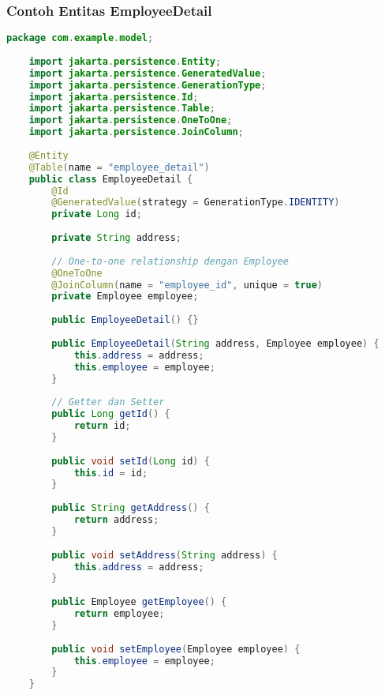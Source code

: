\subsubsection*{Contoh Entitas EmployeeDetail}
\begin{lstlisting}[language=Java, style=JavaStyle]
	package com.example.model;
	
	import jakarta.persistence.Entity;
	import jakarta.persistence.GeneratedValue;
	import jakarta.persistence.GenerationType;
	import jakarta.persistence.Id;
	import jakarta.persistence.Table;
	import jakarta.persistence.OneToOne;
	import jakarta.persistence.JoinColumn;
	
	@Entity
	@Table(name = "employee_detail")
	public class EmployeeDetail {
		@Id
		@GeneratedValue(strategy = GenerationType.IDENTITY)
		private Long id;
		
		private String address;
		
		// One-to-one relationship dengan Employee
		@OneToOne
		@JoinColumn(name = "employee_id", unique = true)
		private Employee employee;
		
		public EmployeeDetail() {}
		
		public EmployeeDetail(String address, Employee employee) {
			this.address = address;
			this.employee = employee;
		}
		
		// Getter dan Setter
		public Long getId() {
			return id;
		}
		
		public void setId(Long id) {
			this.id = id;
		}
		
		public String getAddress() {
			return address;
		}
		
		public void setAddress(String address) {
			this.address = address;
		}
		
		public Employee getEmployee() {
			return employee;
		}
		
		public void setEmployee(Employee employee) {
			this.employee = employee;
		}
	}
\end{lstlisting}

